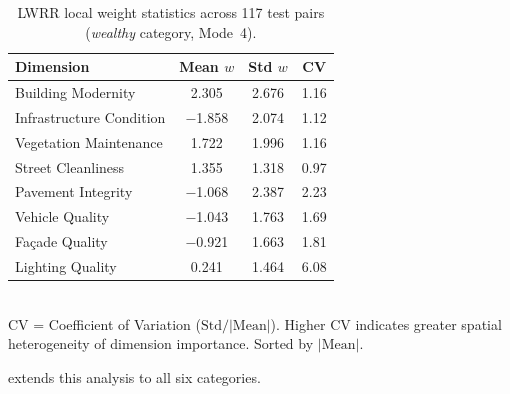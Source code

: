 \documentclass[runningheads]{llncs}
\begin{document}
\begin{table}[H]
\centering
\caption{LWRR local weight statistics across 117 test pairs (\emph{wealthy} category, Mode~4).}
\label{tab:weight_variation}
\small
\begin{tabular}{lccc}
\toprule
Dimension & Mean $w$ & Std $w$ & CV \\
\midrule
Building Modernity        & 2.305 & 2.676 & 1.16 \\
Infrastructure Condition  & $-$1.858 & 2.074 & 1.12 \\
Vegetation Maintenance    & 1.722 & 1.996 & 1.16 \\
Street Cleanliness        & 1.355 & 1.318 & 0.97 \\
Pavement Integrity        & $-$1.068 & 2.387 & 2.23 \\
Vehicle Quality           & $-$1.043 & 1.763 & 1.69 \\
Fa\c{c}ade Quality       & $-$0.921 & 1.663 & 1.81 \\
Lighting Quality          & 0.241 & 1.464 & 6.08 \\
\bottomrule
\end{tabular}
\\[4pt]
\footnotesize{CV = Coefficient of Variation ($\mathrm{Std}/|\mathrm{Mean}|$). Higher CV indicates greater spatial heterogeneity of dimension importance. Sorted by $|\text{Mean}|$.}
\end{table}

 extends this analysis to all six categories.
\end{document}
